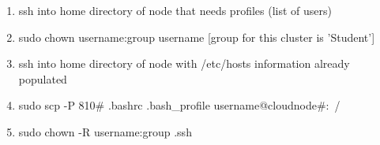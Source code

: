 \begin{enumerate}

\item ssh into home directory of node that needs profiles (list of users)
\item sudo chown username:group username [group for this cluster is 'Student']
\item ssh into home directory of node with /etc/hosts information already populated
\item sudo scp -P 810# .bashrc .bash_profile username@cloudnode#:~/
\item sudo chown -R username:group .ssh
\end{enumerate}
